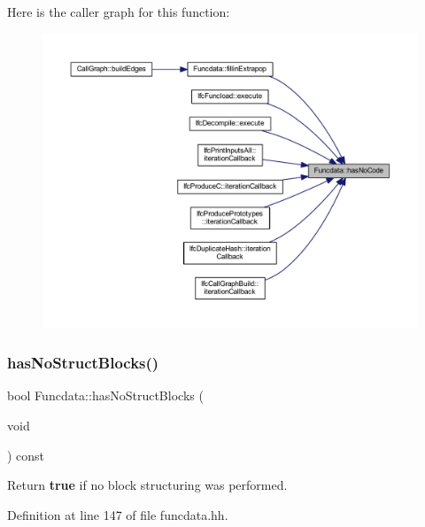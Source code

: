 Here is the caller graph for this function\+:
\nopagebreak
\begin{figure}[H]
\begin{center}
\leavevmode
\includegraphics[width=350pt]{class_funcdata_aca7d46a9a41bb6057d2ad5334103ebb9_icgraph}
\end{center}
\end{figure}
\mbox{\label{class_funcdata_a6840fba2eb01394e02fed1d4b9f77b04}} 
\subsubsection{\texorpdfstring{hasNoStructBlocks()}{hasNoStructBlocks()}}
{\footnotesize\ttfamily bool Funcdata\+::has\+No\+Struct\+Blocks (\begin{DoxyParamCaption}\item[{void}]{ }\end{DoxyParamCaption}) const\hspace{0.3cm}{\ttfamily [inline]}}



Return {\bfseries{true}} if no block structuring was performed. 



Definition at line 147 of file funcdata.\+hh.

